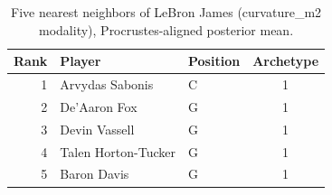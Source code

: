 \begin{table}[htbp]
  \centering\small
  \begin{tabular}{rllc}
    \toprule
    Rank & Player & Position & Archetype \\
    \midrule
    1 & Arvydas Sabonis & C & 1 \\
    2 & De'Aaron Fox & G & 1 \\
    3 & Devin Vassell & G & 1 \\
    4 & Talen Horton-Tucker & G & 1 \\
    5 & Baron Davis & G & 1 \\
    \bottomrule
  \end{tabular}
  \caption{Five nearest neighbors of LeBron James (curvature_m2 modality), Procrustes-aligned posterior mean.}
  \label{tab:LeBron_James_neighbors_curvature_m2}
\end{table}

